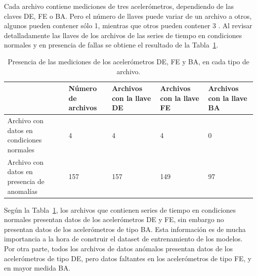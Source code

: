 \documentclass[11pt,a4paper,spanish]{book}
\numberwithin{equation}{chapter}
\numberwithin{figure}{chapter}
\begin{document}
Cada archivo contiene mediciones de tres acelerómetros, dependiendo de las claves DE, FE o BA. Pero el número de llaves puede variar de un archivo a otros, algunos pueden contener sólo 1, mientras que otros pueden contener 3 \cite{rigas2024marine}. Al revisar detalladamente las llaves de los archivos de las series de tiempo en condiciones normales y en presencia de fallas  se obtiene el resultado de la Tabla~\ref{tab:tab1keys}. 


\begin{table}[h]
\centering
\footnotesize
\renewcommand{\arraystretch}{1.5} %
\begin{tabularx}{\textwidth}{|l|X|X|X|X|}
    \hline
    \textbf{} & 
    \textbf{Número de archivos} & 
    \textbf{Archivos con la llave DE} & 
    \textbf{Archivos con la llave FE} & 
    \textbf{Archivos con la llave BA} \\
    \hline
    Archivo con datos en condiciones normales & 4 & 4 & 4 & 0 \\
    \hline
    Archivo con datos en presencia de anomalías & 157 & 157 & 149 & 97 \\
    \hline
\end{tabularx}
\caption{Presencia de las mediciones de los acelerómetros DE, FE y BA, en cada tipo de archivo.}
\label{tab:tab1keys}
\end{table}



Según la Tabla~\ref{tab:tab1keys}, los archivos que contienen series de tiempo en condiciones normales presentan datos de los acelerómetros DE y FE, sin embargo no presentan datos de los acelerómetros de tipo BA. Esta información es de mucha importancia a la hora de construir el dataset de entrenamiento de los modelos. Por otra parte, todos los archivos de datos anómalos presentan datos de los acelerómetros de tipo DE, pero datos faltantes en los acelerómetros de tipo FE, y en mayor medida BA. 
\end{document}
